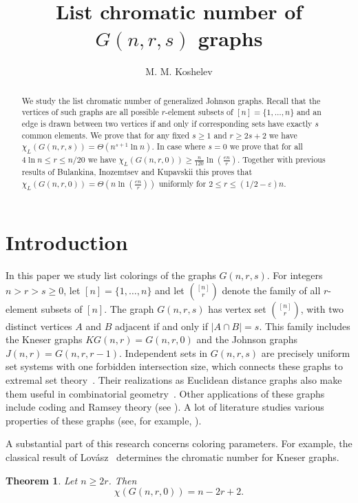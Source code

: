 \documentclass[12pt]{article}
\title{List chromatic number of $G(n,r,s)$ graphs}
\date{}
\author{M. M. Koshelev}
\newtheorem{theorem}{Theorem}
\theoremstyle{remark}
\theoremstyle{definition}
\newcommand{\skob}[1]{\left(#1\right)}
\begin{document}
\maketitle

\begin{abstract}
    We study the list chromatic number of generalized Johnson graphs. Recall that the vertices of such graphs are all possible $r$-element subsets of $[n] = \{1, \dotsc, n\}$ and an edge is drawn between two vertices if and only if corresponding sets have exactly $s$ common elements. We prove that for any fixed $s \geq 1$ and $r \geq 2s + 2$ we have $\chi_L(G(n,r,s)) = \Theta(n^{s+1}\ln n)$. In case where $s = 0$ we prove that for all $4\ln n \leq r \leq n/20$ we have $\chi_L(G(n,r,0)) \geq \frac{n}{120}\ln\skob{\frac{en}{r}}$. Together with previous results of Bulankina, Inozemtsev and Kupavskii this proves that $\chi_L(G(n,r,0)) = \Theta\skob{n\ln\skob{\frac{en}{r}}}$ uniformly for $2 \leq r \leq (1/2-\varepsilon)n$.
\end{abstract}

\section{Introduction}

In this paper we study list colorings of the graphs $G(n,r,s)$. For integers $n > r > s \geq 0$, let $[n]=\{1,\ldots,n\}$ and let $\binom{[n]}{r}$ denote the family of all $r$-element subsets of $[n]$. The graph $G(n,r,s)$ has vertex set $\binom{[n]}{r}$, with two distinct vertices $A$ and $B$ adjacent if and only if $|A\cap B|=s$. This family includes the Kneser graphs $KG(n,r)=G(n,r,0)$ and the Johnson graphs $J(n,r)=G(n,r,r-1)$. Independent sets in $G(n,r,s)$ are precisely uniform set systems with one forbidden intersection size, which connects these graphs to extremal set theory~\cite{FrFu}. Their realizations as Euclidean distance graphs also make them useful in combinatorial geometry~\cite{FrW}. Other applications of these graphs include coding and Ramsey theory (see \cite{Codes, Codes2, Spectrum}). A lot of literature studies various properties of these graphs (see, for example, \cite{RaiMeta,MSp,Shu1,Shu2}).

A substantial part of this research concerns coloring parameters.
For example, the classical result of Lov\'asz~\cite{Lovasz1978} determines the chromatic number for Kneser graphs.
\begin{theorem}\label{LovKG}
    Let $n \geq 2r$. Then
    $$
        \chi(G(n,r,0)) = n-2r+2.
    $$
\end{theorem}
\end{document}
